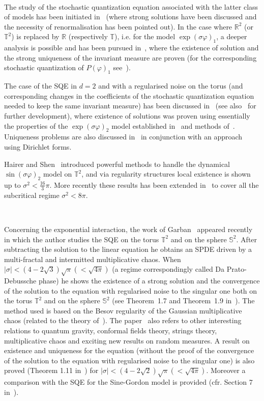\documentclass[a4paper,10pt]{article}
\begin{document}
\

The study of the stochastic quantization equation associated with the latter
class of models has been initiated in~{\cite{AHaRu}} (where strong solutions
have been discussed and the necessity of renormalisation has been pointed
out). In the case where $\mathbb{R}^2$ (or $\mathbb{T}^2$) is replaced by
$\mathbb{R}$ (respectively $\mathbb{T}$), i.e. for the model $\exp (\sigma
\varphi)_1$, a deeper analysis is possible and has been pursued
in~{\cite{AKaRo}}, where the existence of solution and the strong uniqueness
of the invariant measure are proven (for the corresponding stochastic
quantization of $P (\varphi)_1$ see~{\cite{Iwata1987}}).

The case of the SQE in $d = 2$ and with a regularised noise on the torus (and
corresponding changes in the coefficients of the stochastic quantization
equation needed to keep the same invariant measure) has been discussed
in~{\cite{Mi}} (see also~{\cite{AKaMiRo}} for further development), where
existence of solutions was proven using essentially the properties of the
$\exp (\sigma \varphi)_2$ model established in~{\cite{Krohn1974}} and methods
of~{\cite{DaPraDe}}. Uniqueness problems are also discussed
in~{\cite{AKaMiRo}} in conjunction with an approach using Dirichlet forms.

Hairer and Shen~{\cite{HaiShe}} introduced powerful methods to handle the
dynamical $\sin (\sigma \varphi)_2$ model on $\mathbb{T}^2$, and via
regularity structures local existence is shown up to $\sigma^2 < \frac{16}{3}
\pi$. More recently these results has been extended in~{\cite{ChaHaiShe}} to
cover all the subcritical regime $\sigma^2 < 8 \pi$.

\

Concerning the exponential interaction, the work of
Garban~{\cite{Garban2018}} appeared recently in which the author studies the
SQE on the torus $\mathbb{T}^2$ and on the sphere $\mathbb{S}^2$. After
subtracting the solution to the linear equation he obtains an SPDE driven by a
multi-fractal and intermitted multiplicative chaos. When $| \sigma | < \left(
4 - 2 \sqrt{3} \right) \sqrt{\pi} \left( < \sqrt{4 \pi} \right)$ (a regime
correspondingly called Da Prato-Debussche phase) he shows the existence of a
strong solution and the convergence of the solution to the equation with
regularised noise to the singular one both on the torus $\mathbb{T}^2$ and on
the sphere $\mathbb{S}^2$ (see Theorem~1.7 and Theorem~1.9
in~{\cite{Garban2018}}). The method used is based on the Besov regularity of
the Gaussian multiplicative chaos (related to the theory of~{\cite{Ka}}). The
paper~{\cite{Garban2018}} also refers to other interesting relations to
quantum gravity, conformal fields theory, strings theory, multiplicative chaos
and exciting new results on random measures. A result on existence and
uniqueness for the equation (without the proof of the convergence of the
solution to the equation with regularised noise to the singular one) is also
proved (Theorem 1.11 in~{\cite{Garban2018}}) for $| \sigma | < \left( 4 - 2
\sqrt{2} \right) \sqrt{\pi} \left( < \sqrt{4 \pi} \right)$. Moreover a
comparison with the SQE for the Sine-Gordon model is provided (cfr. Section 7
in~{\cite{Garban2018}}).
\end{document}
